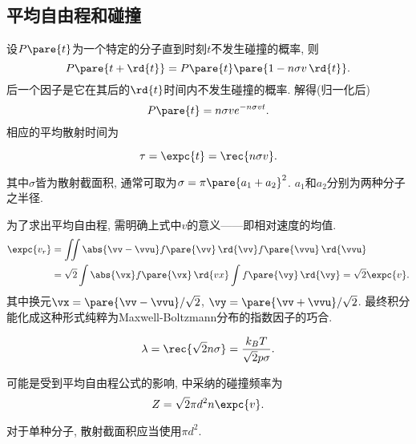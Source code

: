 \documentclass[../Thermal.tex]{subfiles}
\begin{document}
\subsection{平均自由程和碰撞}
设$P\pare{t}$为一个特定的分子直到时刻$t$不发生碰撞的概率, 则
\[ P\pare{t+\rd{t}} = P\pare{t} \pare{1- n\sigma v\,\rd{t}}. \]
后一个因子是它在其后的$\rd{t}$时间内不发生碰撞的概率. 解得(归一化后)
\[ P\pare{t} =  n\sigma ve^{-n\sigma vt}. \]
相应的平均散射时间为
\begin{finale}
\[ \tau = \expc{t} = \rec{n\sigma v}. \]
\end{finale}
其中$\sigma$皆为散射截面积, 通常可取为$\sigma = \pi\pare{a_1+a_2}^2$. $a_1$和$a_2$分别为两种分子之半径.
\par
为了求出平均自由程, 需明确上式中$v$的意义——即相对速度的均值.
\begin{align*}
 \expc{v_r} &= \iint \abs{\vv - \vvu} f\pare{\vv}\,\rd{\vv}f\pare{\vvu}\,\rd{\vvu} \\
 &= \sqrt{2}\int\abs{\vx}f\pare{\vx}\,\rd{vx}\int f\pare{\vy}\,\rd{\vy} = \sqrt{2}\expc{v}.
\end{align*}
其中换元$\vx = \pare{\vv-\vvu}/\sqrt{2}$, $\vy = \pare{\vv+\vvu}/\sqrt{2}$. 最终积分能化成这种形式纯粹为Maxwell-Boltzmann分布的指数因子的巧合.
\begin{finale}
\[ \lambda = \rec{\sqrt{2}n\sigma} = \frac{k_B T}{\sqrt{2}p\sigma}. \]
\end{finale}
\begin{remark}
	可能是受到平均自由程公式的影响, \cite{ZhangYuMin}中采纳的碰撞频率为
	\[ Z = \sqrt{2} \pi d^2 n\expc{v}. \]
\end{remark}
\begin{pitfall}
	对于单种分子, 散射截面积应当使用$\pi d^2$.
\end{pitfall}
\end{document}
